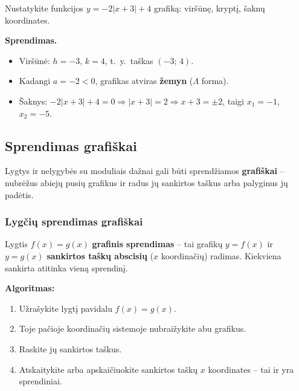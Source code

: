 \begin{example}
Nustatykite funkcijos $y = -2|x + 3| + 4$ grafiką: viršūnę, kryptį, šaknų koordinates.

\textbf{Sprendimas.}

\begin{itemize}
    \item Viršūnė: $h = -3$, $k = 4$, t.~y.\ taškas $(-3;\, 4)$.
    \item Kadangi $a = -2 < 0$, grafikas atviras \textbf{žemyn} ($\Lambda$ forma).
    \item Šaknys: $-2|x+3|+4 = 0 \Rightarrow |x+3| = 2 \Rightarrow x+3 = \pm 2$, taigi $x_1 = -1$, $x_2 = -5$.
\end{itemize}
\end{example}

\subsection{Sprendimas grafiškai}

Lygtys ir nelygybės su moduliais dažnai gali būti sprendžiamos \textbf{grafiškai} – nubrėžus abiejų pusių grafikus ir radus jų sankirtos taškus arba palyginus jų padėtis.

\subsubsection*{Lygčių sprendimas grafiškai}

\begin{definition}
Lygtis $f(x) = g(x)$ \textbf{grafinis sprendimas} – tai grafikų $y = f(x)$ ir $y = g(x)$ \textbf{sankirtos taškų abscisių} ($x$ koordinačių) radimas. Kiekviena sankirta atitinka vieną sprendinį.
\end{definition}

\textbf{Algoritmas:}
\begin{enumerate}
    \item Užrašykite lygtį pavidalu $f(x) = g(x)$.
    \item Toje pačioje koordinačių sistemoje nubraižykite abu grafikus.
    \item Raskite jų sankirtos taškus.
    \item Atskaitykite arba apskaičiuokite sankirtos taškų $x$ koordinates – tai ir yra sprendiniai.
\end{enumerate}

